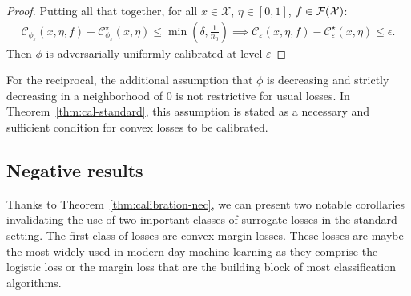 \begin{proof}
    \medskip
    
    Putting all that together, for all $x\in\mathcal{X}$, $\eta\in [0,1]$, $f\in \mathcal{F}(\mathcal{X})$:
    \begin{align*}
        \mathcal{C}_{\phi_\varepsilon}(x,\eta,f) - \mathcal{C}_{\phi_\varepsilon}^\star(x,\eta)\leq \min(\delta,\frac{1}{n_0}) \implies \mathcal{C}_{\varepsilon}(x,\eta,f) - \mathcal{C}_{\varepsilon}^\star(x,\eta)\leq \epsilon.
    \end{align*}
    Then $\phi$ is adversarially uniformly calibrated at level $\varepsilon$
\end{proof}






\begin{rmq} 




For the reciprocal, the additional assumption that $\phi$ is decreasing and strictly decreasing in a neighborhood of $0$ is not restrictive for usual losses. In Theorem~\ref{thm:cal-standard}, this assumption is stated as a necessary and sufficient condition for convex losses to be calibrated.
\end{rmq}





\subsection{Negative results}

Thanks to Theorem~\ref{thm:calibration-nec}, we can present two notable corollaries invalidating the use of two important classes of surrogate losses in the standard setting. The first class of losses are convex margin losses. These losses are maybe the most widely used in modern day machine learning as they comprise the logistic loss or the margin loss that are the building block of most classification algorithms. %

